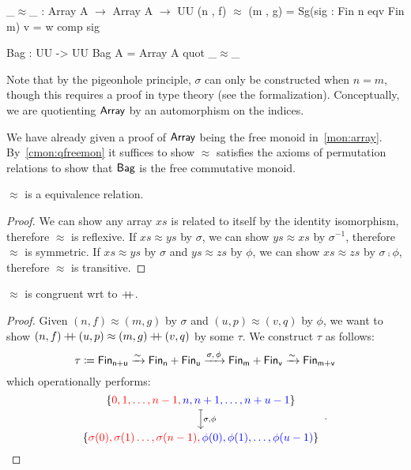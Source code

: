 \begin{definition}[Bag]
    \label{def:bag}
    \leavevmode
    \begin{code}
_$\approx$_ : Array A $\to$ Array A $\to$ UU
(n , f) $\approx$ (m , g) = Sg(sig : Fin n eqv Fin m) v = w comp sig

Bag : UU -> UU
Bag A = Array A quot _$\approx$_
    \end{code}
\end{definition}
\vspace*{-2em}
Note that by the pigeonhole principle, $\sigma$ can only be constructed when $n = m$, though this requires a proof in
type theory (see the formalization).
%
Conceptually, we are quotienting $\operatorname{\mathsf{Array}}$ by an automorphism on the indices.

We have already given a proof of $\operatorname{\mathsf{Array}}$ being the free monoid in~\cref{mon:array}.
%
By~\cref{cmon:qfreemon} it suffices to show $\approx$ satisfies the axioms of permutation relations to show that $\operatorname{\mathsf{Bag}}$
is the free commutative monoid.

\begin{propositionrep}
    $\approx$ is a equivalence relation.
\end{propositionrep}
\begin{proof}
    We can show any array $xs$ is related to itself by the identity isomorphism, therefore $\approx$ is reflexive.
    If $xs \approx ys$ by $\sigma$, we can show $ys \approx xs$ by $\sigma^{-1}$, therefore $\approx$ is symmetric.
    If $xs \approx ys$ by $\sigma$ and $ys \approx zs$ by $\phi$, we can show $xs \approx zs$ by $\sigma \comp \phi$,
    therefore $\approx$ is transitive.
\end{proof}

\begin{proposition}\label{bag:cong}
    $\approx$ is congruent wrt to $\mathbin{+\kern -0.4em+}$.
\end{proposition}

\begin{proof}
    Given $(n, f) \approx (m, g)$ by $\sigma$ and $(u, p) \approx (v, q)$ by $\phi$,
    we want to show $(n, f) \mathbin{+\kern -0.4em+} (u, p) \approx (m, g) \mathbin{+\kern -0.4em+} (v, q)$ by some $\tau$.
    We construct $\tau$ as follows:
    \[
        \tau \defeq \Fin[n+u] \xto{\sim} \Fin[n] + \Fin[u] \xto{\sigma,\,\phi} \Fin[m] + \Fin[v] \xto{\sim} \Fin[m+v] \\
    \]
    which operationally performs:
    \[
        \begin{tikzcd}[ampersand replacement=\&,cramped]
            {\{\color{red}0,1,\dots,n-1, \color{blue} n,n+1,\dots,n+u-1 \color{black}\}} \\
            { \{\color{red}\sigma(0),\sigma(1)\dots,\sigma(n-1), \color{blue}\phi(0),\phi(1),\dots,\phi(u-1) \color{black}\}}
            \arrow["{\sigma,\phi}", maps to, from=1-1, to=2-1]
        \end{tikzcd}
        \enspace.
    \]
\end{proof}

